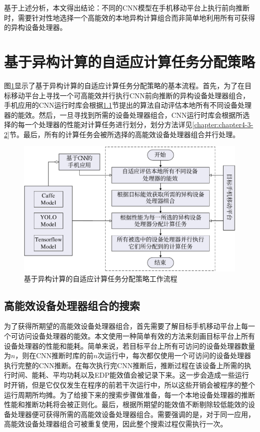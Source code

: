基于上述分析，本文得出结论：不同的CNN模型在手机移动平台上执行前向推断时，需要针对性地选择一个高能效的本地异构计算组合而非简单地利用所有可获得的异构设备处理器。

\section{基于异构计算的自适应计算任务分配策略}

图\ref{figure:figure29}显示了基于异构计算的自适应计算任务分配策略的基本流程。首先，为了在目标移动平台上寻找一个可高能效并行执行CNN前向推断的异构设备处理器组合，手机应用的CNN运行时库会根据\ref{chapter:chapter4-3-1}节提出的算法自动评估本地所有不同设备处理器的能效。然后，一旦寻找到所需的设备处理器组合，CNN运行时库会根据所选择的每一个处理器的性能对计算任务进行划分，划分方法详见\ref{chapter:chapter4-3-2}节。最后，所有的计算任务会被所选择的高能效设备处理器组合并行处理。

\begin{figure}[htbp]
    \centering
    \includegraphics[height=0.4\textwidth]{figures/strategy_overview.pdf}
    \caption{基于异构计算的自适应计算任务分配策略工作流程}\label{figure:figure29}
\end{figure}

\subsection{高能效设备处理器组合的搜索}
\label{chapter:chapter4-3-1}

为了获得所期望的高能效设备处理器组合，首先需要了解目标手机移动平台上每一个可访问设备处理器的能效。本文使用一种简单有效的方法来刻画目标平台上所有设备处理器的性能和能耗。简单来说，若目标平台上所有可访问的设备处理器数量为$n$，则在CNN推断时库的前$n$次运行中，每次都仅使用一个可访问的设备处理器执行完整的CNN推断。在每次执行完CNN推断后，推断过程在该设备上所需的执行时间、能耗、平均功耗以及EDP能效值会被记录下来。这一步会造成一些运行时开销，但是它仅仅发生在程序的前若干次运行中，所以这些开销会被程序的整个运行周期所均摊。为了给接下来的搜索步骤做准备，每一个本地设备处理器的推断性能和推断功耗将会被正则化。最后，根据所期望的能效值不断剔除较低能效的设备处理器便可获得所需的高能效设备处理器组合。需要强调的是，对于同一应用，高能效设备处理器组合可被重复使用，因此整个搜索过程仅需执行一次。

